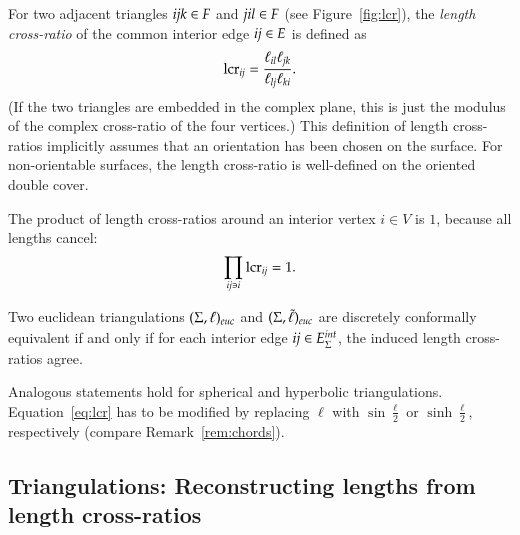 \documentclass[Thesis]{subfiles}
\begin{document}
For two adjacent triangles ${\it ijk}\in F$ and ${\it jil}\in F$ (see Figure~\ref{fig:lcr}), the
\emph{length cross-ratio} of the common interior edge ${\it ij}\in E$ is defined
as
\begin{equation}
\label{eq:lcr}
\operatorname{lcr}_{\it ij}=\frac{\ell_{\it il}\ell_{\it jk}}{\ell_{\it lj}\ell_{\it ki}}.
\end{equation}
(If the two triangles are embedded in the complex plane, this is just
the modulus of the complex cross-ratio of the four vertices.)  This
definition of length cross-ratios implicitly assumes that an
orientation has been chosen on the surface. For non-orientable
surfaces, the length cross-ratio is well-defined on the oriented
double cover.

The product of length cross-ratios around an interior vertex $i\in V$ is $1$, because all lengths cancel:
\begin{equation}
  \label{eq:lcr_product}
  \prod_{{\it ij}\ni i} \operatorname{lcr}_{\it ij} = 1.
\end{equation}

\begin{proposition}%
  Two euclidean triangulations $(\Sigma, \ell)_{\euc}$ and $(\Sigma,
  \tilde \ell)_{\euc}$ are discretely conformally equivalent if and
  only if for each interior edge ${\it ij}\in E^{\mathit{int}}_{\Sigma}$, the induced length
  cross-ratios agree.
\end{proposition}

\begin{remark}
  Analogous statements hold for spherical and hyperbolic
  triangulations. Equation~\eqref{eq:lcr} has to be modified by
  replacing $\ell$ with $\sin\frac{\ell}{2}$ or $\sinh\frac{\ell}{2}$,
  respectively (compare Remark~\ref{rem:chords}).
\end{remark}

\subsection{Triangulations: Reconstructing lengths from length cross-ratios}
\label{sec:ell_from_lcr}
\end{document}
